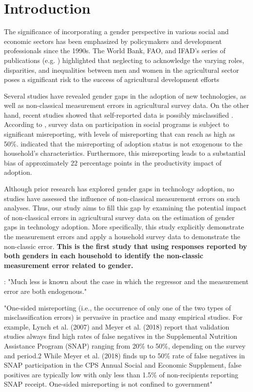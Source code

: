 \documentclass[12pt]{article}
\begin{document}
	
	
	
	\doublespacing
	
	
	\section{Introduction} \label{sec:introduction}
	
		The significance of incorporating a gender perspective in various social and economic sectors has been emphasized by policymakers and development professionals since the 1990s. The World Bank, FAO, and IFAD's series of publications (e.g. \cite{quisumbing2014gender, fortmann2009gender}) highlighted that neglecting to acknowledge the varying roles, disparities, and inequalities between men and women in the agricultural sector poses a significant risk to the success of agricultural development efforts

	  Several studies have revealed gender gaps in the adoption of new technologies, as well as non-classical measurement errors in agricultural survey data. On the other hand, recent studies showed that self-reported data is possibly misclassified \citep{wossen2019estimating}. According to \citep{meyer2009under}, survey data on participation in social programs is subject to significant misreporting, with levels of misreporting that can reach as high as 50\%.\cite{wossen2019estimating} indicated that the misreporting of adoption status is not exogenous to the household's characteristics. Furthermore, this misreporting leads to a substantial bias of approximately 22 percentage points in the productivity impact of adoption.
	  
	Although prior research has explored gender gaps in technology adoption, no studies have assessed the influence of non-classical measurement errors on such analyses. Thus, our study aims to fill this gap by examining the potential impact of non-classical errors in agricultural survey data on the estimation of gender gaps in technology adoption. More specifically, this study explicitly demonstrate the measurement errors and apply a household survey data to demonstrate the non-classic error. \textbf{This is the first study that using responses reported by both genders in each household to identify the non-classic measurement error related to gender.  }
	
	
\cite{nguimkeu2019estimation}: "Much less is known about the case in which the regressor and the measurement error are both endogenous."
	
	"One-sided misreporting (i.e., the occurrence of only one of the two types of misclassification errors)
	is pervasive in practice and many empirical studies. For example, Lynch et al. (2007) and Meyer et al. (2018) report that
	validation studies always find high rates of false negatives in the Supplemental Nutrition Assistance Program (SNAP) ranging
	from 20\% to 50\%, depending on the survey and period.2 While Meyer et al. (2018) finds up to 50\% rate of false negatives in
	SNAP participation in the CPS Annual Social and Economic Supplement, false positives are typically low with only less than
	1.5\% of non-recipients reporting SNAP receipt.
	One-sided misreporting is not confined to government"
	   
\end{document}
